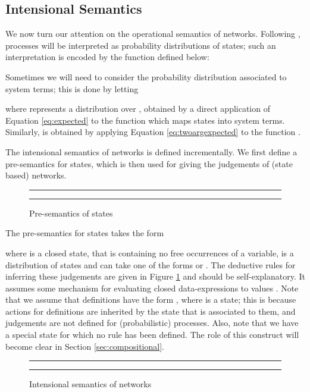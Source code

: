 \documentclass{LMCS}
\begin{document}
\subsection{Intensional Semantics}
\label{sec:int.sem}
We now turn our attention on the operational semantics of networks.  
Following \cite{DGHM09full}, processes will be interpreted as probability 
distributions of states; such an interpretation is encoded by the function  
defined below: 

Sometimes we will need to consider the probability distribution associated to system terms; 
this is done by letting 

where  represents a distribution over , 
obtained by a direct application of Equation \eqref{eq:expected} 
to the function  which maps states into system terms. 
Similarly,  is obtained by 
applying Equation \eqref{eq:twoargexpected} to the function 
.

The intensional semantics of networks is defined incrementally. 
We first define a pre-semantics for states, which is then used 
for giving the judgements of (state based) networks.

\begin{figure}[t]
\rule{\linewidth}{0.5mm}
  
  \caption{Pre-semantics of states}
  \label{fig:stsem}

\rule{\linewidth}{0.5mm}
\end{figure}

The pre-semantics for states takes the form

where  is a closed state, that is containing no free occurrences of a variable,  
  is a distribution of states and  can take one of the forms  or . 
The deductive rules for inferring these judgements are given in Figure \ref{fig:stsem}
and should be self-explanatory. It assumes some mechanism for evaluating closed data-expressions
 to values . Note that we assume that definitions have the form , 
where  is a state; this is because actions for definitions are inherited by the state that is 
associated to them, and judgements are not defined for (probabilistic) processes. Also, note that 
we have a special state  for which no rule has been defined. The role of 
this construct will become clear in Section \ref{sec:compositional}.

\begin{figure}[t]
\rule{\linewidth}{0.5mm}
  
  \caption{Intensional semantics of networks}
  \label{fig:opsem}

\rule{\linewidth}{0.5mm}
\end{figure}
\end{document}
